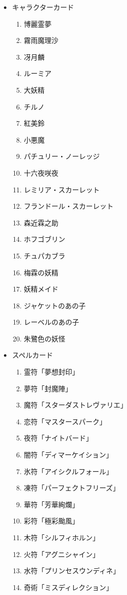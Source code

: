 \documentclass[line_length=22zw,number_of_lines=45,twocolumn]{jlreq}
\begin{document}
\begin{itemize}
	\item キャラクターカード
		\begin{enumerate}
			\item 博麗霊夢
			\item 霧雨魔理沙
			\item 冴月麟
			\item ルーミア
			\item 大妖精
			\item チルノ
			\item 紅美鈴
			\item 小悪魔
			\item パチュリー・ノーレッジ
			\item 十六夜咲夜
			\item レミリア・スカーレット
			\item フランドール・スカーレット
			\item 森近霖之助
			\item ホフゴブリン
			\item チュパカブラ
			\item 梅霖の妖精
			\item 妖精メイド
			\item ジャケットのあの子
			\item レーベルのあの子
			\item 朱鷺色の妖怪
		\end{enumerate}
	\item スペルカード
		\begin{enumerate}
			\item 霊符「夢想封印」
			\item 夢符「封魔陣」
			\item 魔符「スターダストレヴァリエ」
			\item 恋符「マスタースパーク」
			\item 夜符「ナイトバード」
			\item 闇符「ディマーケイション」
			\item 氷符「アイシクルフォール」
			\item 凍符「パーフェクトフリーズ」
			\item 華符「芳華絢爛」
			\item 彩符「極彩颱風」
			\item 木符「シルフィホルン」
			\item 火符「アグニシャイン」
			\item 水符「プリンセスウンディネ」
			\item 奇術「ミスディレクション」

\end{enumerate}
\end{itemize}
\end{document}
